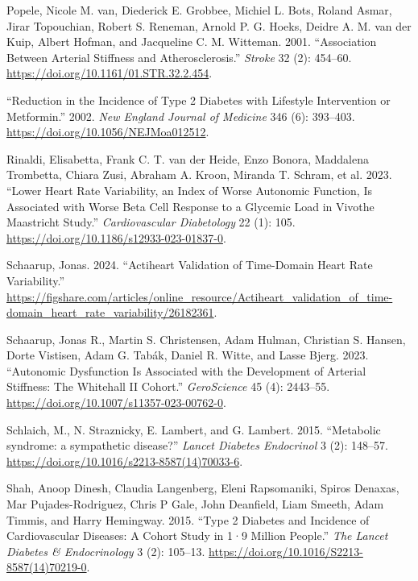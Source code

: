\documentclass[
  a4paper,
  headsepline=true,
  open=any]{scrbook}
\newlength{\cslhangindent}
\newlength{\cslentryspacingunit} %
\newenvironment{CSLReferences}[2] %
 {%
  \setlength{\parindent}{0pt}
  \ifodd #1
  \let\oldpar\par
  \def\par{\hangindent=\cslhangindent\oldpar}
  \fi
  \setlength{\parskip}{#2\cslentryspacingunit}
 }%
 {}
\begin{document}
\begin{CSLReferences}{1}{0}
\leavevmode{}%
Popele, Nicole M. van, Diederick E. Grobbee, Michiel L. Bots, Roland
Asmar, Jirar Topouchian, Robert S. Reneman, Arnold P. G. Hoeks, Deidre
A. M. van der Kuip, Albert Hofman, and Jacqueline C. M. Witteman. 2001.
{``Association Between Arterial Stiffness and Atherosclerosis.''}
\emph{Stroke} 32 (2): 454--60.
\url{https://doi.org/10.1161/01.STR.32.2.454}.

\leavevmode{}%
{``Reduction in the Incidence of Type 2 Diabetes with Lifestyle
Intervention or Metformin.''} 2002. \emph{New England Journal of
Medicine} 346 (6): 393--403. \url{https://doi.org/10.1056/NEJMoa012512}.

\leavevmode{}%
Rinaldi, Elisabetta, Frank C. T. van der Heide, Enzo Bonora, Maddalena
Trombetta, Chiara Zusi, Abraham A. Kroon, Miranda T. Schram, et al.
2023. {``Lower Heart Rate Variability, an Index of Worse Autonomic
Function, Is Associated with Worse Beta Cell Response to a Glycemic Load
in Vivo{\textemdash}the Maastricht Study.''} \emph{Cardiovascular
Diabetology} 22 (1): 105.
\url{https://doi.org/10.1186/s12933-023-01837-0}.

\leavevmode{}%
Schaarup, Jonas. 2024. {``Actiheart Validation of Time-Domain Heart Rate
Variability.''}
\url{https://figshare.com/articles/online_resource/Actiheart_validation_of_time-domain_heart_rate_variability/26182361}.

\leavevmode{}%
Schaarup, Jonas R., Martin S. Christensen, Adam Hulman, Christian S.
Hansen, Dorte Vistisen, Adam G. Tabák, Daniel R. Witte, and Lasse Bjerg.
2023. {``Autonomic Dysfunction Is Associated with the Development of
Arterial Stiffness: The Whitehall II Cohort.''} \emph{GeroScience} 45
(4): 2443--55. \url{https://doi.org/10.1007/s11357-023-00762-0}.

\leavevmode{}%
Schlaich, M., N. Straznicky, E. Lambert, and G. Lambert. 2015.
{``Metabolic syndrome: a sympathetic disease?''} \emph{Lancet Diabetes
Endocrinol} 3 (2): 148--57.
\url{https://doi.org/10.1016/s2213-8587(14)70033-6}.

\leavevmode{}%
Shah, Anoop Dinesh, Claudia Langenberg, Eleni Rapsomaniki, Spiros
Denaxas, Mar Pujades-Rodriguez, Chris P Gale, John Deanfield, Liam
Smeeth, Adam Timmis, and Harry Hemingway. 2015. {``Type 2 Diabetes and
Incidence of Cardiovascular Diseases: A Cohort Study in 1·9 Million
People.''} \emph{The Lancet Diabetes \& Endocrinology} 3 (2): 105--13.
\url{https://doi.org/10.1016/S2213-8587(14)70219-0}.


\end{CSLReferences}
\end{document}
